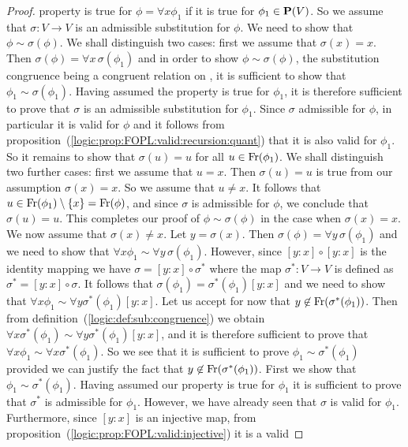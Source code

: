 \begin{proof}
property is true for $\phi=\forall x\phi_{1}$ if it is true for
$\phi_{1}\in\mbox{${\bf P}(V)$}$. So we assume that $\sigma:V\to V$ is an admissible
substitution for $\phi$. We need to show that
$\phi\sim\sigma(\phi)$. We shall distinguish two cases: first we
assume that $\sigma(x)=x$. Then $\sigma(\phi)=\forall
x\,\sigma(\phi_{1})$ and in order to show $\phi\sim\sigma(\phi)$,
the substitution congruence being a congruent relation on \pv, it is
sufficient to show that $\phi_{1}\sim\sigma(\phi_{1})$. Having
assumed the property is true for $\phi_{1}$, it is therefore
sufficient to prove that $\sigma$ is an admissible substitution for
$\phi_{1}$. Since $\sigma$ admissible for $\phi$, in particular it
is valid for $\phi$ and it follows from
proposition~(\ref{logic:prop:FOPL:valid:recursion:quant}) that it is
also valid for $\phi_{1}$. So it remains to show that $\sigma(u)=u$
for all $u\in\mbox{\rm Fr}(\phi_{1})$. We shall distinguish two further
cases: first we assume that $u=x$. Then $\sigma(u)=u$ is true from
our assumption $\sigma(x)=x$. So we assume that $u\neq x$. It
follows that $u\in\mbox{\rm Fr}(\phi_{1})\setminus\{x\}=\mbox{\rm Fr}(\phi)$, and
since $\sigma$ is admissible for $\phi$, we conclude that
$\sigma(u)=u$. This completes our proof of $\phi\sim\sigma(\phi)$ in
the case when $\sigma(x)=x$. We now assume that $\sigma(x)\neq x$.
Let $y=\sigma(x)$. Then $\sigma(\phi)=\forall y\,\sigma(\phi_{1})$
and we need to show that $\forall x\phi_{1}\sim\forall
y\,\sigma(\phi_{1})$. However, since $[y\!:\!x]\circ[y\!:\!x]$ is
the identity mapping we have $\sigma=[y\!:\!x]\circ\sigma^{*}$ where
the map $\sigma^{*}:V\to V$ is defined as
$\sigma^{*}=[y\!:\!x]\circ\sigma$. It follows that
$\sigma(\phi_{1})=\sigma^{*}(\phi_{1})[y\!:\!x]$ and we need to show
that $\forall x\phi_{1}\sim\forall y\sigma^{*}(\phi_{1})[y\!:\!x]$.
Let us accept for now that $y\not\in\mbox{\rm Fr}(\sigma^{*}(\phi_{1}))$.
Then from definition~(\ref{logic:def:sub:congruence}) we obtain
$\forall x\sigma^{*}(\phi_{1})\sim\forall
y\sigma^{*}(\phi_{1})[y\!:\!x]$, and it is therefore sufficient to
prove that $\forall x\phi_{1}\sim\forall x\sigma^{*}(\phi_{1})$. So
we see that it is sufficient to prove
$\phi_{1}\sim\sigma^{*}(\phi_{1})$ provided we can justify the fact
that $y\not\in\mbox{\rm Fr}(\sigma^{*}(\phi_{1}))$. First we show that
$\phi_{1}\sim\sigma^{*}(\phi_{1})$. Having assumed our property is
true for $\phi_{1}$ it is sufficient to prove that $\sigma^{*}$ is
admissible for $\phi_{1}$. However, we have already seen that
$\sigma$ is valid for $\phi_{1}$. Furthermore, since $[y\!:\!x]$ is
an injective map, from
proposition~(\ref{logic:prop:FOPL:valid:injective}) it is a valid

\end{proof}
